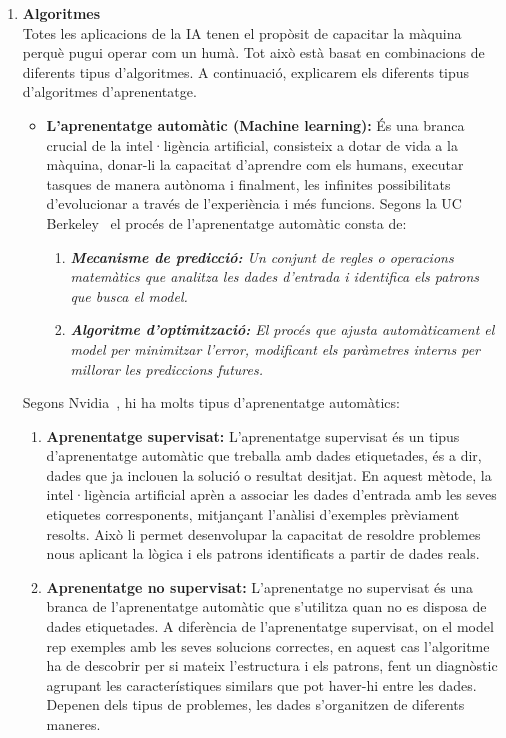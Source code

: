 \begin{enumerate}
    \item \textbf{Algoritmes}\\
    Totes les aplicacions de la IA tenen el propòsit de capacitar la màquina perquè pugui operar com un humà. Tot això està basat en combinacions de diferents tipus d'algoritmes. A continuació, explicarem els diferents tipus d'algoritmes d'aprenentatge.
    \begin{itemize}
        \item \textbf{L'aprenentatge automàtic (Machine learning):}\label{Aprenentatge_automàtic}
        És una branca crucial de la intel·ligència artificial, consisteix a dotar de vida a la màquina, donar-li la capacitat d'aprendre com els humans, executar tasques de manera autònoma i finalment, les infinites possibilitats d'evolucionar a través de l'experiència i més funcions. Segons la UC Berkeley~\cite{Berkeley} el procés de l'aprenentatge automàtic consta de:
        \begin{enumerate}
            \item \textit{\textbf{Mecanisme de predicció: } Un conjunt de regles o operacions matemàtics que analitza les dades d'entrada i identifica els patrons que busca el model.}

            \item \textit{\textbf{Algoritme d'optimització: } El procés que ajusta automàticament el model per minimitzar l'error, modificant els paràmetres interns per millorar les prediccions futures.}
        \end{enumerate}
    \end{itemize}

    Segons Nvidia~\cite{Nvidia}, hi ha molts tipus d'aprenentatge automàtics:
    \begin{enumerate}
        \item \textbf{Aprenentatge supervisat:}
        L'aprenentatge supervisat és un tipus d'aprenentatge automàtic que treballa amb dades etiquetades, és a dir, dades que ja inclouen la solució o resultat desitjat. En aquest mètode, la intel·ligència artificial aprèn a associar les dades d'entrada amb les seves etiquetes corresponents, mitjançant l'anàlisi d'exemples prèviament resolts. Això li permet desenvolupar la capacitat de resoldre problemes nous aplicant la lògica i els patrons identificats a partir de dades reals.

        \item \textbf{Aprenentatge no supervisat:}
        L'aprenentatge no supervisat és una branca de l'aprenentatge automàtic que s'utilitza quan no es disposa de dades etiquetades. A diferència de l'aprenentatge supervisat, on el model rep exemples amb les seves solucions correctes, en aquest cas l'algoritme ha de descobrir per si mateix l'estructura i els patrons, fent un diagnòstic agrupant les característiques similars que pot haver-hi entre les dades. Depenen dels tipus de problemes, les dades s'organitzen de diferents maneres.


\end{enumerate}
\end{enumerate}

